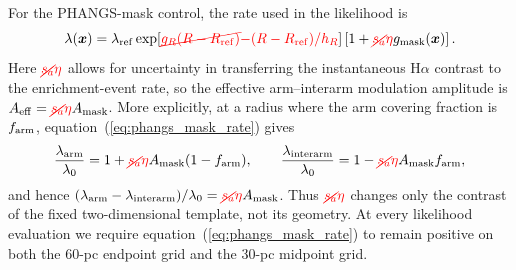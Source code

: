 \documentclass[fleqn,usenatbib]{mnras}
\newcommand{\bs}[1]{\boldsymbol{#1}}
\newcommand{\revaddmath}[1]{\textcolor{red}{#1}}
\newcommand{\revdelmath}[1]{\textcolor{red}{\cancel{#1}}}
\begin{document}
For the PHANGS-mask control, the rate used in the likelihood is
\begin{equation}
    \lambda(\bs{x})=
    \lambda_{\rm ref}\exp[\revdelmath{g_R(R-R_{\rm ref})}\revaddmath{-(R-R_{\rm ref})/h_R}]
    \left[1+\revdelmath{s_a}\revaddmath{\eta} g_{\rm mask}(\bs{x})\right].
    \label{eq:phangs_mask_rate}
\end{equation}
Here $\revdelmath{s_a}\revaddmath{\eta}$ allows for uncertainty in transferring the instantaneous H$\alpha$ contrast to the enrichment-event rate, so the effective arm--interarm modulation amplitude is $A_{\rm eff}=\revdelmath{s_a}\revaddmath{\eta}A_{\rm mask}$.  More explicitly, at a radius where the arm covering fraction is $f_{\rm arm}$, equation~(\ref{eq:phangs_mask_rate}) gives
\begin{equation}
    \frac{\lambda_{\rm arm}}{\lambda_0}
    =1+\revdelmath{s_a}\revaddmath{\eta}A_{\rm mask}(1-f_{\rm arm}),
    \qquad
    \frac{\lambda_{\rm interarm}}{\lambda_0}
    =1-\revdelmath{s_a}\revaddmath{\eta}A_{\rm mask}f_{\rm arm},
    \label{eq:phangs_effective_arm_amplitude}
\end{equation}
and hence $(\lambda_{\rm arm}-\lambda_{\rm interarm})/\lambda_0=\revdelmath{s_a}\revaddmath{\eta}A_{\rm mask}$.  Thus $\revdelmath{s_a}\revaddmath{\eta}$ changes only the contrast of the fixed two-dimensional template, not its geometry.  At every likelihood evaluation we require equation~(\ref{eq:phangs_mask_rate}) to remain positive on both the 60-pc endpoint grid and the 30-pc midpoint grid.
\end{document}
